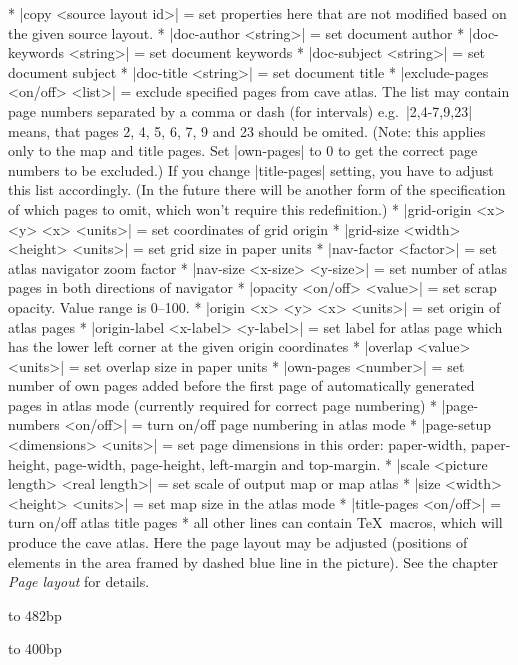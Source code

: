 \comopt 
  * |copy <source layout id>| = set properties here that are not
    modified based on the given source layout.
  * |doc-author <string>| = set document author
  * |doc-keywords <string>| = set document keywords
  * |doc-subject <string>| = set document subject
  * |doc-title <string>| = set document title
  * |exclude-pages <on/off> <list>| = exclude specified pages from cave
    atlas. The list may contain page numbers separated by a comma or dash (for intervals) 
    e.g.~|2,4-7,9,23| means, that pages 2, 4, 5, 6, 7, 9 and 23 should be 
    omited. (Note: this applies only to the map and title pages. Set 
    |own-pages| to 0 to get the correct page numbers to be excluded.) 
    If you change |title-pages| setting, you have to
    adjust this list accordingly. (In the future there will be another form
    of the specification of which pages to omit, which won't require
    this redefinition.)
  * |grid-origin <x> <y> <x> <units>| = set coordinates of grid
    origin
  * |grid-size <width> <height> <units>| = set grid size in paper
    units
  * |nav-factor <factor>| = set atlas navigator zoom factor
  * |nav-size <x-size> <y-size>| = set number of atlas pages in
    both directions of navigator
  * |opacity <on/off> <value>| = set scrap opacity. Value range is 0--100.
  * |origin <x> <y> <x> <units>| = set origin of atlas pages
  * |origin-label <x-label> <y-label>| = set label for atlas page
    which has the lower left corner at the given origin coordinates
  * |overlap <value> <units>| = set overlap size in paper units
  * |own-pages <number>| = set number of own pages added before
    the first page of automatically generated pages in atlas mode
    (currently required for correct page numbering)
  * |page-numbers <on/off>| = turn on/off page numbering in atlas mode
  * |page-setup <dimensions> <units>| = set page dimensions in
    this order: paper-width, paper-height, page-width, page-height,
    left-margin and top-margin.
  * |scale <picture length> <real length>| = set scale of
    output map or map atlas
  * |size <width> <height> <units>| = set map size in the atlas mode
  * |title-pages <on/off>| = turn on/off atlas title pages
  * all other lines can contain \TeX\ macros, which will produce
    the cave atlas. Here the page layout may be adjusted (positions
    of elements in the area framed by dashed blue line in the picture).
    See the chapter {\it Page layout} for details.
\endcomopt

\midinsert
  \ifx\pdfoutput\undefined\else
  \fi
  \vbox to 482bp{\centerline{\hbox to 400bp{%
    \ifx\pdfoutput\undefined
    \else
      \rlap{\pdfrefximage\pdflastximage}%
    \fi
    \hss}}\vss
  }
\endinsert


